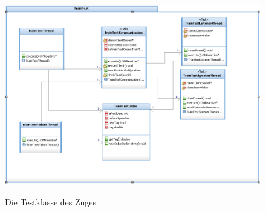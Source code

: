 \begin{figure}
	\caption{Die Testklasse des Zuges}
	\includegraphics[width=1\textwidth]{content/pictures/train_test/train_test.png}
	\label{pic:train_test}
\end{figure}
